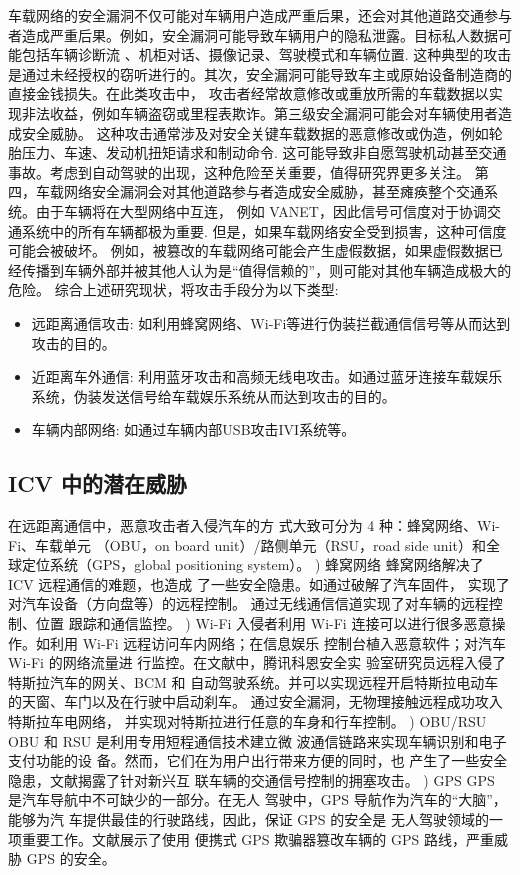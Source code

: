 车载网络的安全漏洞不仅可能对车辆用户造成严重后果，还会对其他道路交通参与者造成严重后果。例如，安全漏洞可能导致车辆用户的隐私泄露。目标私人数据可能包括车辆诊断流
、机柜对话、摄像记录、驾驶模式和车辆位置\cite{amoozadeh2015security}. 
这种典型的攻击是通过未经授权的窃听进行的。其次，安全漏洞可能导致车主或原始设备制造商的直接金钱损失。在此类攻击中，
攻击者经常故意修改或重放所需的车载数据以实现非法收益，例如车辆盗窃或里程表欺诈。第三级安全漏洞可能会对车辆使用者造成安全威胁。
这种攻击通常涉及对安全关键车载数据的恶意修改或伪造，例如轮胎压力、车速、发动机扭矩请求和制动命令. 
这可能导致非自愿驾驶机动甚至交通事故。考虑到自动驾驶的出现，这种危险至关重要，值得研究界更多关注。
第四，车载网络安全漏洞会对其他道路参与者造成安全威胁，甚至瘫痪整个交通系统。由于车辆将在大型网络中互连，
例如 VANET，因此信号可信度对于协调交通系统中的所有车辆都极为重要\cite{harding2014vehicle}.
 但是，如果车载网络安全受到损害，这种可信度可能会被破坏。
 例如，被篡改的车载网络可能会产生虚假数据，如果虚假数据已经传播到车辆外部并被其他人认为是“值得信赖的”，则可能对其他车辆造成极大的危险。
综合上述研究现状，将攻击手段分为以下类型:
\begin{itemize}
    \item 远距离通信攻击: 如利用蜂窝网络、Wi-Fi等进行伪装拦截通信信号等从而达到攻击的目的。
    \item 近距离车外通信: 利用蓝牙攻击和高频无线电攻击。如通过蓝牙连接车载娱乐系统，伪装发送信号给车载娱乐系统从而达到攻击的目的。
    \item 车辆内部网络: 如通过车辆内部USB攻击IVI系统等。
\end{itemize}

\subsection[]{ICV 中的潜在威胁}
在远距离通信中，恶意攻击者入侵汽车的方
式大致可分为 4 种：蜂窝网络、Wi-Fi、车载单元
（OBU，on board unit）/路侧单元（RSU，road side
unit）和全球定位系统（GPS，global positioning
system）。
) 蜂窝网络
蜂窝网络解决了 ICV 远程通信的难题，也造成
了一些安全隐患。如通过破解了汽车固件，
实现了对汽车设备（方向盘等）的远程控制。
通过无线通信信道实现了对车辆的远程控制、位置
跟踪和通信监控。
) Wi-Fi
入侵者利用 Wi-Fi 连接可以进行很多恶意操
作。如利用 Wi-Fi 远程访问车内网络；在信息娱乐
控制台植入恶意软件；对汽车 Wi-Fi 的网络流量进
行监控。在文献\cite{keen}中，腾讯科恩安全实
验室研究员远程入侵了特斯拉汽车的网关、BCM 和
自动驾驶系统。并可以实现远程开启特斯拉电动车的天窗、车门以及在行驶中启动刹车。
通过安全漏洞，无物理接触远程成功攻入特斯拉车电网络，
并实现对特斯拉进行任意的车身和行车控制。
) OBU/RSU
OBU 和 RSU 是利用专用短程通信技术建立微
波通信链路来实现车辆识别和电子支付功能的设
备。然而，它们在为用户出行带来方便的同时，也
产生了一些安全隐患，文献\cite{yongsai}揭露了针对新兴互
联车辆的交通信号控制的拥塞攻击。
) GPS
GPS 是汽车导航中不可缺少的一部分。在无人
驾驶中，GPS 导航作为汽车的“大脑”，能够为汽
车提供最佳的行驶路线，因此，保证 GPS 的安全是
无人驾驶领域的一项重要工作。文献\cite{cuigai}展示了使用
便携式 GPS 欺骗器篡改车辆的 GPS 路线，严重威
胁 GPS 的安全。
